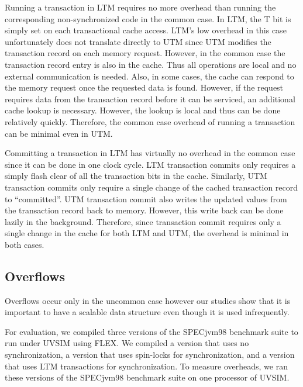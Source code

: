 Running a transaction in LTM requires no more overhead than running
the corresponding non-synchronized code in the common case. In LTM,
the T bit is simply set on each transactional cache access. LTM's low
overhead in this case unfortunately does not translate directly to UTM
since UTM modifies the transaction record on each memory
request. However, in the common case the transaction record entry is
also in the cache. Thus all operations are local and no external
communication is needed. Also, in some cases, the cache can respond to
the memory request once the requested data is found. However, if the
request requires data from the transaction record before it can be
serviced, an additional cache lookup is necessary. However, the lookup
is local and thus can be done relatively quickly.  Therefore, the common case overhead of
running a transaction can be minimal even in UTM.

Committing a transaction in LTM has virtually no overhead in the
common case since it can be done in one clock cycle. LTM transaction
commits only requires a simply flash clear of all the transaction bits
in the cache. Similarly, UTM transaction commits only require a single
change of the cached transaction record to ``committed''. UTM
transaction commit also writes the updated values from the transaction
record back to memory. However, this write back can be done lazily in
the background.  Therefore, since transaction commit requires only a
single change in the cache for both LTM and UTM, the overhead is
minimal in both cases.

\subsection{Overflows}

Overflows occur only in the uncommon case
however our studies show that it is important to have a scalable data
structure even though it is used infrequently.

For evaluation, we compiled three versions of the SPECjvm98 benchmark
suite to run under UVSIM using FLEX. We compiled
a  version that uses no synchronization, a 
version that uses spin-locks for synchronization, and a 
version that uses LTM transactions for synchronization. To measure
overheads, we ran these versions of the SPECjvm98 benchmark suite on
one processor of UVSIM.

